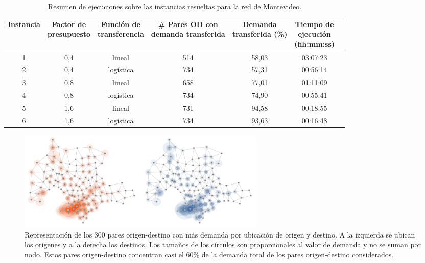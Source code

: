 \begin{table}[h!]
  \centering
  \begin{adjustbox}{width=1.2\textwidth,center=\textwidth}
    \begin{tabular}{ccccccc}
      \toprule
        Instancia & \shortstack{Factor de \\ presupuesto} & \shortstack{Función de \\ transferencia} & \shortstack{\# Pares OD con \\ demanda transferida} & \shortstack{Demanda \\ transferida (\%)} & \shortstack{Tiempo de \\ ejecución \\ (hh:mm:ss)} \\
      \midrule
        1 & 0,4 & lineal    & 514 & 58,03 & 03:07:23 \\
        2 & 0,4 & logística & 734 & 57,31 &  00:56:14 \\
        3 & 0,8 & lineal    & 658 & 77,01 &  01:11:09 \\
        4 & 0,8 & logística & 734 & 74,90 &  00:55:41 \\
        5 & 1,6 & lineal    & 731 & 94,58 &  00:18:55 \\
        6 & 1,6 & logística & 734 & 93,63 &  00:16:48 \\
      \bottomrule
    \end{tabular}
  \end{adjustbox}
  \caption{Resumen de ejecuciones sobre las instancias resueltas para la red de Montevideo.}\label{table:montevideoexecutions}
\end{table}

\begin{figure}[h!]
  \centering
  \includegraphics[width=12cm]{../resources/montevideo_demands.png}
    \caption{Representación de los 300 pares origen-destino con más demanda por ubicación de origen y destino. A la izquierda se ubican los orígenes y a la derecha los destinos. Los tamaños de los círculos son proporcionales al valor de demanda y no se suman por nodo. Estos pares origen-destino concentran casi el 60\% de la demanda total de los pares origen-destino considerados.}
  \label{fig:montevideodemanddist}
\end{figure}

